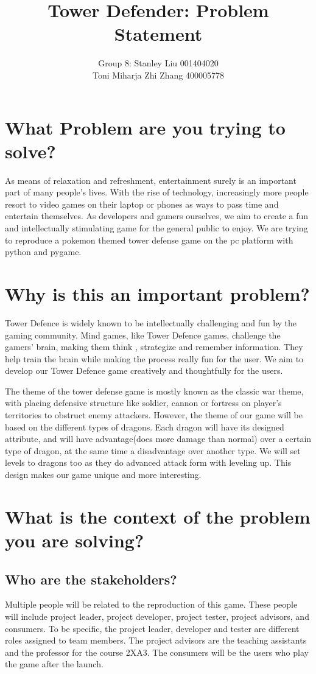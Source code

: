 \documentclass[12pt]{article}
\title{Tower Defender: Problem Statement}
\author{Group 8: Stanley Liu 001404020\\    
                 Toni Miharja
                 Zhi Zhang 400005778}
\begin{document}
\maketitle

\section {What Problem are you trying to solve?}
As means of relaxation and refreshment, entertainment surely is an important part of many people’s lives. With the rise of technology, increasingly more people resort to video games on their laptop or phones as ways to pass time and entertain themselves. As developers and gamers ourselves, we aim to create a fun and intellectually stimulating game for the general public to enjoy. We are trying to reproduce a pokemon themed tower defense game on the pc platform with python and pygame.

\section {Why is this an important problem?}
Tower Defence is widely known to be intellectually challenging and fun by the gaming community. Mind games, like Tower Defence games, challenge the gamers’ brain, making them think , strategize and remember information. They help train the brain while making the process really fun for the user. We aim to develop  our Tower Defence game creatively and thoughtfully for the users.

The theme of the tower defense game is mostly known as the classic war theme, with placing defensive structure like soldier, cannon or fortress on player’s territories to obstruct enemy attackers. However, the theme of our game will be based on the different types of dragons. Each dragon will have its designed attribute, and will have advantage(does more damage than normal) over a certain type of dragon, at the same time a disadvantage over another type. We will set levels to dragons too as they do advanced attack form with leveling up. This design makes our game unique and more interesting.
\section {What is the context of the problem you are solving?}
    \subsection {Who are the stakeholders?}
    Multiple people will be related to the reproduction of this game. These people will include project leader, project developer, project tester, project advisors, and consumers. To be specific, the project leader, developer and tester are different roles assigned to team members. The project advisors are the teaching assistants and the professor for the course 2XA3. The consumers will be the users who play the game after the launch.
\end{document}
